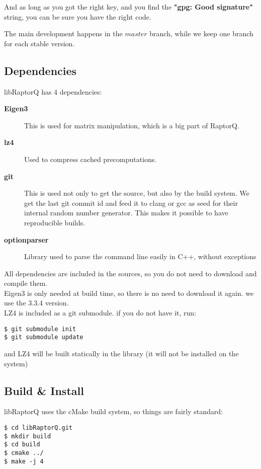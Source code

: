 \documentclass[11pt,a4paper]{refart}
\begin{document}
And as long as you got the right key, and you find the \textbf{"gpg: Good signature"} string,
you can be sure you have the right code.

The main development happens in the $master$ branch, while we keep one branch for each stable version.


\subsection{Dependencies}

libRaptorQ has 4 dependencies:
\begin{description}
\item[\textbf{Eigen3}] This is used for matrix manipulation, which is a big part of RaptorQ.
\item[\textbf{lz4}] Used to compress cached precomputations.
\item[\textbf{git}] This is used not only to get the source, but also by the build system. We get the last git commit id and feed it to clang or gcc as seed for their internal random number generator. This makes it possible to have reproducible builds.

\item[\textbf{optionparser}] Library used to parse the command line easily in C++, without exceptions
\end{description}

All dependencies are included in the sources, so you do not need to download and compile them.\\
Eigen3 is only needed at build time, so there is no need to download it again. we use the 3.3.4 version.\\
LZ4 is included as a git submodule. if you do not have it, run:
\begin{verbatim}
$ git submodule init
$ git submodule update
\end{verbatim}
and LZ4 will be built statically in the library (it will not be installed on the system)

\subsection{Build \& Install}

libRaptorQ uses the cMake build system, so things are fairly standard:

\begin{verbatim}
$ cd libRaptorQ.git
$ mkdir build
$ cd build
$ cmake ../
$ make -j 4
\end{verbatim}
\end{document}
